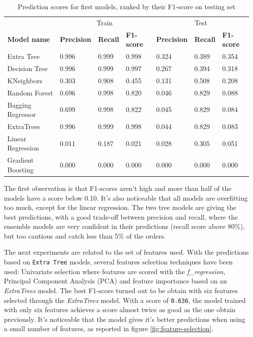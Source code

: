 \begin{table}[!htb]
    \begin{tabular}{l|lll|lll}
                          & \multicolumn{3}{c|}{Train}                         & \multicolumn{3}{c}{Test}      \\
        \textbf{Model name}        & \textbf{Precision} & \textbf{Recall} & \textbf{F1-score} & \textbf{Precision} & \textbf{Recall} & \textbf{F1-score} \\ \hline
        Extra Tree        & 0.996     & 0.999  & 0.998                         & 0.324     & 0.389  & 0.354    \\
        Decision Tree     & 0.996     & 0.999  & 0.997                         & 0.267     & 0.394  & 0.318   \\
        KNeighbors        & 0.303     & 0.908  & 0.455                         & 0.131     & 0.508  & 0.208    \\
        Random Forest     & 0.696     & 0.998  & 0.820                         & 0.046     & 0.829  & 0.088    \\
        Bagging Regressor & 0.699     & 0.998  & 0.822                         & 0.045     & 0.829  & 0.084    \\
        ExtraTrees        & 0.996     & 0.999  & 0.998                         & 0.044     & 0.829  & 0.083    \\
        Linear Regression & 0.011     & 0.187  & 0.021                         & 0.028     & 0.305  & 0.051    \\
        Gradient Boosting & 0.000     & 0.000  & 0.000                         & 0.000     & 0.000  & 0.000    \\
    \end{tabular}
    \caption{Prediction scores for first models, ranked by their F1-score on testing set}
    \label{tab:scores-simple-models}
\end{table}

The first observation is that F1-scores aren't high and more than half of the models have a score below 0.10. It's also noticeable that all models are overfitting too much, except for the linear regression. The two tree models are giving the best predictions, with a good trade-off between precision and recall, where the ensemble models are very confident in their predictions (recall score above 80\%), but too cautious and catch less than 5\% of the orders.

The next experiments are related to the set of features used. With the predictions based on \texttt{Extra Tree} models, several features selection techniques have been used: Univariate selection where features are scored with the \textit{f\_regression}, Principal Component Analysis (PCA) and feature importance based on an \textit{ExtraTrees} model. The best F1-score turned out to be obtain with six features selected through the \textit{ExtraTrees} model. With a score of \texttt{0.636}, the model trained with only six features achieves a score almost twice as good as the one obtain previously. It's noticeable that the model gives it's better predictions when using a small number of features, as reported in figure \ref{fig:feature-selection}.

